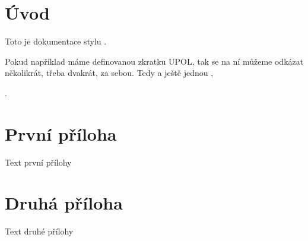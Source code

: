 \documentclass[a4paper,12pt]{article}
\begin{document}
\upmaketitle

\upmakeanot

\uptocandlists

\section{Úvod}
Toto je dokumentace stylu .


Pokud například máme definovanou zkratku UPOL, tak se na ní můžeme odkázat několikrát, třeba dvakrát, za sebou. Tedy  a ještě jednou ,

.

\upendoftreatise

\upappendix
\section{První příloha}
Text první přílohy

\section{Druhá příloha}
Text druhé přílohy

\upendoftreatise



\upprinttheoremlist

\upprintbibliography

\end{document}

